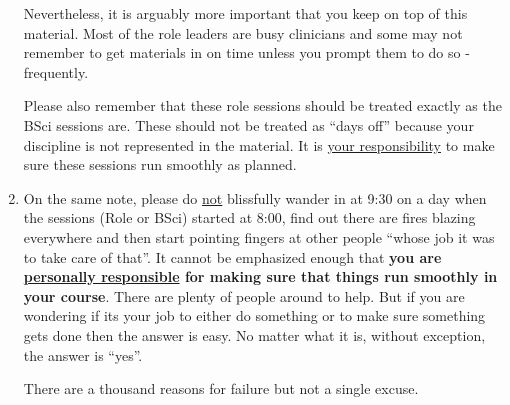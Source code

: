 \documentclass[11pt]{article}
\begin{document}
\begin{enumerate}
  Nevertheless, it is arguably more important that you keep on top of this material.  Most of the role leaders are busy clinicians and some may not remember to get materials in on time unless you prompt them to do so - frequently.

  Please also remember that these role sessions should be treated exactly as the BSci sessions are.  These should not be treated as ``days off'' because your discipline is not represented in the material.  It is \underline{your responsibility} to make sure these sessions run smoothly as planned.
\item On the same note, please do \underline{not} blissfully wander in at 9:30 on a day when the sessions (Role or BSci) started at 8:00, find out there are fires blazing everywhere and then start pointing fingers at other people ``whose job it was to take care of that''.  It cannot be emphasized enough that \textbf{you are \underline{personally responsible} for making sure that things run smoothly in your course}.  There are plenty of people around to help.  But if you are wondering if its your job to either do something or to make sure something gets done then the answer is easy.  No matter what it is, without exception, the answer is ``yes''.

  There are a thousand reasons for failure but not a single excuse.
\end{enumerate}
\end{document}
